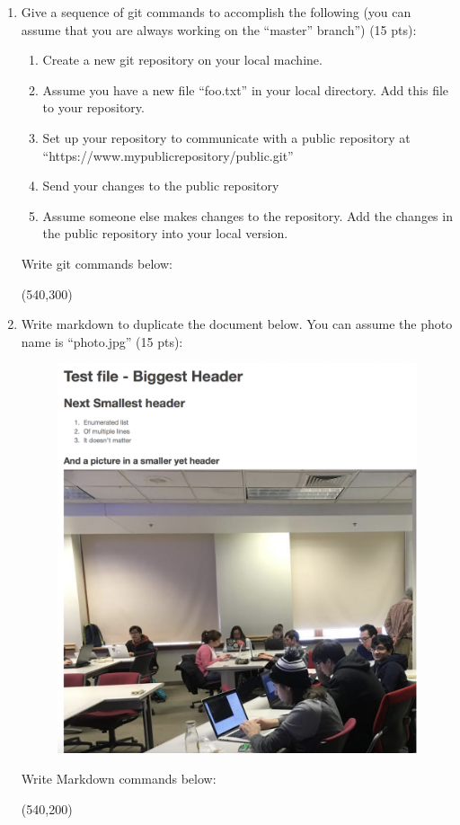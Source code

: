 \documentclass[10pt]{article}
\begin{document}
\begin{enumerate}
\item Give a sequence of git commands to accomplish the following (you can assume that you are always working on the ``master'' branch'') (15 pts):
\begin{enumerate}
	\item Create a new git repository on your local machine.
	\item Assume you have a new file ``foo.txt'' in your local directory. Add this file to your repository.
	\item Set up your repository to communicate with a public repository at ``https://www.mypublicrepository/public.git''
	\item Send your changes to the public repository
	\item Assume someone else makes changes to the repository. Add the changes in the public repository into your local version. 
\end{enumerate}
\bigskip
Write git commands below:

\hspace*{-0.4in}\framebox(540,300){}
\newpage

\item Write markdown to duplicate the document below. You can assume the photo name is ``photo.jpg'' (15 pts):
\begin{figure}[h]
\centering
\includegraphics[width=0.7\linewidth]{./test_markdown}
\label{fig:testmarkdown}
\end{figure}

\bigskip
Write Markdown commands below:

\hspace*{-0.4in}\framebox(540,200){}
\newpage



\end{enumerate}
\end{document}
